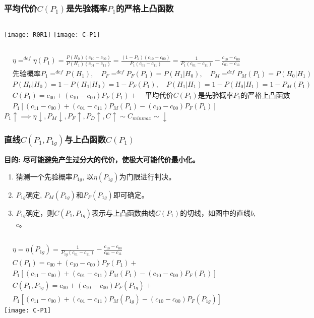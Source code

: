 \begin{frame}[shrink]
\frametitle{平均代价$C(P_1)$是先验概率$P_1$的严格上凸函数}
\begin{columns}%
\texttt{[image: R0R1]}
\texttt{[image: C-P1]}
\end{columns}
\begin{align*}
&\eta\mathop{=}^{def}\eta(P_1)=\frac{P(H_0)(c_{10}-c_{00})}{P(H_1)(c_{01}-c_{11})}=\frac{(1-P_1)(c_{10}-c_{00})}{P_1(c_{01}-c_{11})}=\frac{1}{P_1(c_{01}-c_{11})}-\frac{c_{10}-c_{00}}{c_{01}-c_{11}}\\
&\text{先验概率}P_1\mathop{=}^{def}P(H_1),\quad P_F\mathop{=}^{def}P_F(P_1)=P(H_1|H_0),\quad  P_M\mathop{=}^{def}P_M(P_1)=P(H_0|H_1)\\
&P(H_0|H_0)=1-P(H_1|H_0)=1-P_F(P_1),\quad P(H_1|H_1)=1-P(H_0|H_1)=1-P_M(P_1)\\
&C(P_1)=c_{00}+(c_{10}-c_{00})P_F(P_1)+  \quad \textbf{平均代价$C(P_1)$是先验概率$P_1$的严格上凸函数}\\
&P_1[(c_{11}-c_{00})+(c_{01}-c_{11})P_M(P_1)-(c_{10}-c_{00})P_F(P_1)]
\end{align*}
$P_1\uparrow\implies \eta\downarrow, P_M\downarrow, P_F\uparrow, P_D\uparrow, C\uparrow\sim C_{minmax}\sim\downarrow$
\end{frame}

\begin{frame}[shrink]
\frametitle{直线$C(P_1,P_{1g})$与上凸函数$C(P_1)$}
\textbf{目的: 尽可能避免产生过分大的代价，使极大可能代价最小化。}
\begin{enumerate}
	\item 猜测一个先验概率$P_{1g}$, 以$\eta(P_{1g})$为门限进行判决。
	\item $P_{1g}$确定, $P_M(P_{1g})$和$P_F(P_{1g})$即可确定。
	\item $P_{1g}$确定，则$C(P_1,P_{1g})$表示与上凸函数曲线$C(P_1)$的切线，如图中的直线$b$, $c$。
\end{enumerate}
\begin{columns}
	\begin{align*}
	&\eta=\eta(P_{1g})=\frac{1}{P_{1g}(c_{01}-c_{11})}-\frac{c_{10}-c_{00}}{c_{01}-c_{11}}\\
	&C(P_1)=c_{00}+(c_{10}-c_{00})P_F(P_1)+\\
	&P_1[(c_{11}-c_{00})+(c_{01}-c_{11})P_M(P_1)-(c_{10}-c_{00})P_F(P_1)]\\
	&C(P_1,P_{1g})=c_{00}+(c_{10}-c_{00})P_F(P_{1g})+\\
	&P_1[(c_{11}-c_{00})+(c_{01}-c_{11})P_M(P_{1g})-(c_{10}-c_{00})P_F(P_{1g})]
	\end{align*}
	\texttt{[image: C-P1]}
\end{columns}
\end{frame}

